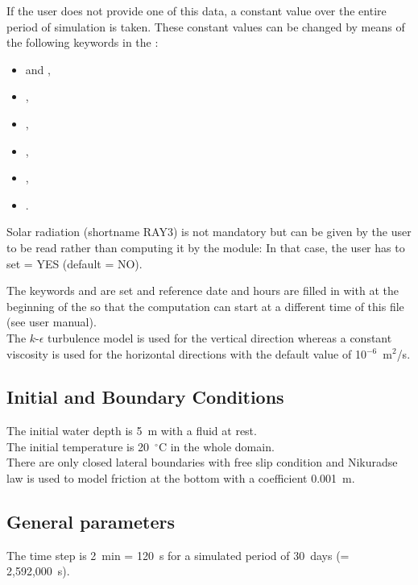 If the user does not provide one of this data, a constant value over the entire
period of simulation is taken.
These constant values can be changed by means of the following keywords in the
 :
\begin{itemize}
\item {} and ,
\item {},
\item {},
\item {},
\item {},
\item {}.
\end{itemize}

Solar radiation (shortname RAY3) is not mandatory but can be given by the user
to be read rather than computing it by the module:
In that case, the user has to set 
= YES (default = NO).

The keywords  and 
are set and reference date and hours are filled in with 
at the beginning of the  so that
the computation can start at a different time of this file (see 
user manual).\\

The $k$-$\epsilon$ turbulence model is used for the vertical direction whereas
a constant viscosity is used for the horizontal directions with the default value
of 10$^{-6}$~m$^2$/s.
%
\subsection{Initial and Boundary Conditions}
%
The initial water depth is 5~m with a fluid at rest.\\
The initial temperature is 20~$^{\circ}$C in the whole domain.\\

There are only closed lateral boundaries with free slip condition and
Nikuradse law is used to model friction at the bottom with a coefficient
0.001~m.
%
\subsection{General parameters}
%
The time step is 2~min = 120~s for a simulated period of 30~days
(= 2,592,000~s).
%
